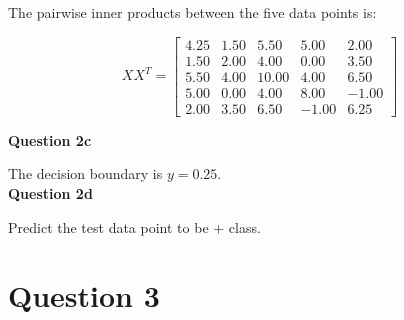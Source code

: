 \documentclass[11pt,a4paper]{report}
\begin{document}
\begin{multicols*}{2}
\noindent The pairwise inner products between the five data points is:

$$X X^{T} =
\begin{bmatrix}
4.25 & 1.50 &  5.50 &  5.00  &  2.00\\
1.50 & 2.00 &  4.00 &  0.00  &  3.50\\
5.50 & 4.00 & 10.00 &  4.00  &  6.50\\
5.00 & 0.00 &  4.00 &  8.00  & -1.00\\
2.00 & 3.50 &  6.50 & -1.00  &  6.25
\end{bmatrix}$$

\noindent \textbf{Question 2c}


\noindent The decision boundary is $y=0.25$.\\

\noindent \textbf{Question 2d}

\noindent Predict the test data point to be + class.

\section{Question 3}

\end{multicols*}
\end{document}
